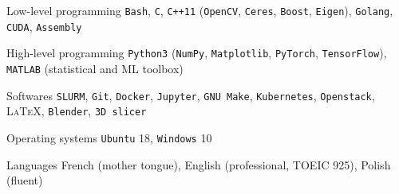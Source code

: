 


\begin{cvskills}


\cvskill
{Low-level programming} %
{\texttt{Bash}, \texttt{C}, \texttt{C++11} (\texttt{OpenCV}, \texttt{Ceres}, \texttt{Boost}, \texttt{Eigen}), \texttt{Golang}, \texttt{CUDA}, \texttt{Assembly}} %


\cvskill
{High-level programming} %
{\texttt{Python3} (\texttt{NumPy}, \texttt{Matplotlib}, \texttt{PyTorch}, \texttt{TensorFlow}), \texttt{MATLAB} (statistical and ML toolbox)} %


\cvskill
{Softwares} %
{\texttt{SLURM}, \texttt{Git}, \texttt{Docker}, \texttt{Jupyter}, \texttt{GNU Make}, \texttt{Kubernetes}, \texttt{Openstack}, \textsc{\LaTeX}, \texttt{Blender}, \texttt{3D slicer}} %


\cvskill
{Operating systems} %
{\texttt{Ubuntu} 18, \texttt{Windows} 10} %


\cvskill
{Languages} %
{French (mother tongue), English (professional, TOEIC 925), Polish (fluent)} %


\end{cvskills}
